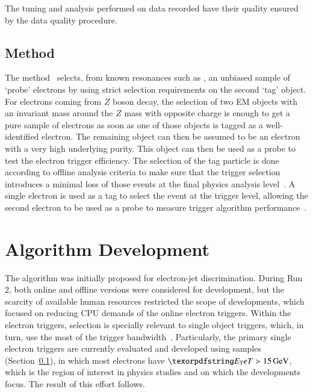 The tuning and analysis performed on data recorded have their quality ensured by the data quality procedure. 

%


\subsection{\TnP Method}\label{ssec:tnp}

The \tnp{} method~\cite{PERF-2016-01} selects, from known resonances such as \Zee{}, an unbiased sample of `probe' electrons by using strict selection requirements on the second `tag' object. For electrons coming from $Z$ boson decay, the selection of two EM objects with an invariant mass around the $Z$ mass with opposite charge is enough to get a pure sample of electrons as soon as one of those objects is tagged as a well-identified electron. The remaining object can then be assumed to be an electron with a very high underlying purity. This object can then be used as a probe to test the electron trigger efficiency. The selection of the tag particle is done according to offline analysis criteria to make sure that the trigger selection introduces a minimal loss of those events at the final physics analysis level~\cite{aaboud2019electron}. A single electron is used as a tag to select the event at the trigger level, allowing the second electron to be used as a probe to measure trigger algorithm performance~\cite{aad2020performance}.


\section{Algorithm Development}\label{ssec:rnn_for_online_and_eletrons}

The \rnn{} algorithm was initially proposed for electron-jet discrimination. 
During Run 2, both online and offline versions
were considered for  development, but the scarcity of available human resources restricted the scope of developments, which focused on reducing CPU demands of the online electron triggers. Within the electron triggers, \hlt{} selection is
specially relevant to single object triggers, which, in turn, use the most of the trigger bandwidth~\cite{aad2020performance}. Particularly, the primary single electron triggers
are currently evaluated and developed using \Zee{} \tnp{} samples 
(Section~\ref{ssec:tnp}), in which most electrons have $\et>\SI{15}{\GeV}$, which is the region of interest in physics studies and on which the \rnn{} developments focus. The result of this effort
follows.


